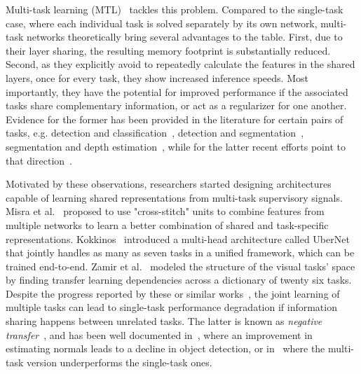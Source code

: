 \documentclass[runningheads]{llncs}
\begin{document}
Multi-task learning (MTL)~\cite{caruana1997multitask,ruder2017overview} tackles this problem. Compared to the single-task case, where each individual task is solved separately by its own network, multi-task networks theoretically bring several advantages to the table. First, due to their layer sharing, the resulting memory footprint is substantially reduced. Second, as they explicitly avoid to repeatedly calculate the features in the shared layers, once for every task, they show increased inference speeds. Most importantly, they have the potential for improved performance if the associated tasks share complementary information, or act as a regularizer for one another. Evidence for the former has been provided in the literature for certain pairs of tasks, e.g. detection and classification~\cite{girshick2015fast,ren2015faster}, detection and segmentation~\cite{dvornik2017blitznet,he2017mask}, segmentation and depth estimation~\cite{eigen2015predicting,xu2018pad}, while for the latter recent efforts point to that direction~\cite{standley2019tasks}.

Motivated by these observations, researchers started designing architectures capable of learning shared representations from multi-task supervisory signals. Misra et al.~\cite{misra2016cross} proposed to use "cross-stitch" units to combine features from multiple networks to learn a better combination of shared and task-specific representations. Kokkinos~\cite{kokkinos2017ubernet} introduced a multi-head architecture called UberNet that jointly handles as many as seven tasks in a unified framework, which can be trained end-to-end. Zamir et al.~\cite{zamir2018taskonomy} modeled the structure of the visual tasks' space by finding transfer learning dependencies across a dictionary of twenty six tasks. Despite the progress reported by these or similar works~\cite{sermanet2013overfeat,lu2017fully,neven2017fast,liu2019end,vandenhende2019branched}, the joint learning of multiple tasks can lead to single-task performance degradation if information sharing happens between unrelated tasks. The latter is known as \emph{negative transfer}~\cite{zhao2018modulation}, and has been well documented in~\cite{kokkinos2017ubernet}, where an improvement in estimating normals leads to a decline in object detection, or in~\cite{he2017mask} where the multi-task version underperforms the single-task ones.
\end{document}
